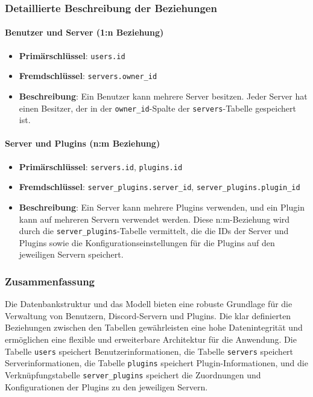 \subsubsection{Detaillierte Beschreibung der
Beziehungen}\label{detaillierte-beschreibung-der-beziehungen}

\paragraph{Benutzer und Server (1:n
Beziehung)}\label{benutzer-und-server-1n-beziehung}

\begin{itemize}
\item
  \textbf{Primärschlüssel}: \texttt{users.id}
\item
  \textbf{Fremdschlüssel}: \texttt{servers.owner\_id}
\item
  \textbf{Beschreibung}: Ein Benutzer kann mehrere Server besitzen.
  Jeder Server hat einen Besitzer, der in der \texttt{owner\_id}-Spalte
  der \texttt{servers}-Tabelle gespeichert ist.
\end{itemize}

\paragraph{Server und Plugins (n:m
Beziehung)}\label{server-und-plugins-nm-beziehung}

\begin{itemize}
\item
  \textbf{Primärschlüssel}: \texttt{servers.id}, \texttt{plugins.id}
\item
  \textbf{Fremdschlüssel}: \texttt{server\_plugins.server\_id},
  \texttt{server\_plugins.plugin\_id}
\item
  \textbf{Beschreibung}: Ein Server kann mehrere Plugins verwenden, und
  ein Plugin kann auf mehreren Servern verwendet werden. Diese
  n:m-Beziehung wird durch die \texttt{server\_plugins}-Tabelle
  vermittelt, die die IDs der Server und Plugins sowie die
  Konfigurationseinstellungen für die Plugins auf den jeweiligen Servern
  speichert.
\end{itemize}

\subsubsection{Zusammenfassung}\label{zusammenfassung}

Die Datenbankstruktur und das Modell bieten eine robuste Grundlage für
die Verwaltung von Benutzern, Discord-Servern und Plugins. Die klar
definierten Beziehungen zwischen den Tabellen gewährleisten eine hohe
Datenintegrität und ermöglichen eine flexible und erweiterbare
Architektur für die Anwendung. Die Tabelle \texttt{users} speichert
Benutzerinformationen, die Tabelle \texttt{servers} speichert
Serverinformationen, die Tabelle \texttt{plugins} speichert
Plugin-Informationen, und die Verknüpfungstabelle
\texttt{server\_plugins} speichert die Zuordnungen und Konfigurationen
der Plugins zu den jeweiligen Servern.

